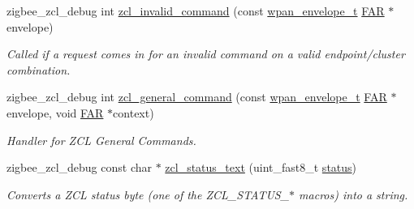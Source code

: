 \begin{DoxyCompactItemize}
zigbee\-\_\-zcl\-\_\-debug int \hyperlink{group__zcl_ga4251fbed33d85d2f7bbccb48857cae95}{zcl\-\_\-invalid\-\_\-command} (const \hyperlink{structwpan__envelope__t}{wpan\-\_\-envelope\-\_\-t} \hyperlink{group__hal_gaef060b3456fdcc093a7210a762d5f2ed}{F\-A\-R} $\ast$envelope)
\begin{DoxyCompactList}\small\item\em Called if a request comes in for an invalid command on a valid endpoint/cluster combination. \end{DoxyCompactList}\item 
zigbee\-\_\-zcl\-\_\-debug int \hyperlink{group__zcl_gac3849121e93e777ce9a7510d24517b9b}{zcl\-\_\-general\-\_\-command} (const \hyperlink{structwpan__envelope__t}{wpan\-\_\-envelope\-\_\-t} \hyperlink{group__hal_gaef060b3456fdcc093a7210a762d5f2ed}{F\-A\-R} $\ast$envelope, void \hyperlink{group__hal_gaef060b3456fdcc093a7210a762d5f2ed}{F\-A\-R} $\ast$context)
\begin{DoxyCompactList}\small\item\em Handler for Z\-C\-L General Commands. \end{DoxyCompactList}\item 
zigbee\-\_\-zcl\-\_\-debug const char $\ast$ \hyperlink{group__zcl_ga04c32f1b9f6c36fae06e9bed5bd8f7dd}{zcl\-\_\-status\-\_\-text} (uint\-\_\-fast8\-\_\-t \hyperlink{group__xbee__atcmd_gade818037fd6c985038ff29656089758d}{status})
\begin{DoxyCompactList}\small\item\em Converts a Z\-C\-L status byte (one of the Z\-C\-L\-\_\-\-S\-T\-A\-T\-U\-S\-\_\-$\ast$ macros) into a string. \end{DoxyCompactList}\end{DoxyCompactItemize}
